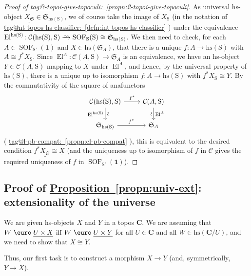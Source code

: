 \documentclass{amsart}
\makeatletter
\newcommand\alttext{\texorpdfstring}
\newcommand\bC{\mathbf{C}}
\newcommand\cC{\mathcal{C}}
\newcommand\Ein{\mathrel{\text{\textup{\euro}}}}
\newcommand\El{\operatorname{El}}
\newcommand\fS{\mathfrak{S}}
\newcommand\hs{\mathrm{hs}}
\newcommand\rS{\mathrm{S}}
\newcommand\SOF{\operatorname{SOF}}
\newcommand\tm{\mathbf{1}}
\newcommand\toi{\xrightarrow{\raisebox{-2.5pt}[0pt][0pt]{\ensuremath{\scriptstyle{\sim}}}}}
\newcommand\und[1]{\underline{#1}}
\newcommand\tagword[1]{\csname tag@#1\endcsname}
\def\label@tag#1:#2\@nil{#1}
\newcommand\labeltag[1]{\label@tag#1:\@nil}
\newcommand\jref[1]{%
  \texorpdfstring%
    {\hyperref[#1]{\tagword{\labeltag{#1}}~\ref*{#1}}}%
    {\tagword{\labeltag{#1}}~\ref*{#1}}%
}
\theoremstyle{definition}
\theoremstyle{remark}
\theoremstyle{plainwithref}
\makeatother
\begin{document}
\begin{proof}[Proof of \jref{propn:2-topoi-give-topoculi}]
  As universal hs-object \( \und{X_\fS} \in \fS_{\hs(\rS)} \), we of course take the image of \( X_\rS \) (in the notation of \jref{defn:int-topos-hs-classifier}) under the equivalence \( \El^{\hs(\rS)} \colon \cC(\hs(\rS), \rS) \toi \SOF_{\rS}(\rS) \cong \fS_{\hs(\rS)} \).
  We then need to check, for each \( A \in \SOF_{\rS'}(\tm) \) and \( X \in \hs(\fS_A) \), that there is a unique \( f \colon A \to \hs(\rS) \) with \( A \cong f^* X_\rS \).
  Since \( \El^A \colon \cC(A, \rS) \to \fS_A \) is an equivalence, we have an hs-object \( Y \in \cC(A, \rS) \) mapping to \( X \) under \( \El^A \), and hence, by the universal property of \( \hs(\rS) \), there is a unique up to isomorphism \( f \colon A \to \hs(\rS) \) with \( f^* X_\rS \cong Y \).
  By the commutativity of the square of anafunctors
  \[
    \begin{tikzcd}
      \cC(\hs(\rS), \rS) \ar[r, "f^*"] \ar[d, "\El^{\hs(\rS)}"', "\sim" sloped] & \cC(A, \rS) \ar[d, "\El^{A}", "\sim"' sloped] \\
      \fS_{\hs(\rS)} \ar[r, "f^*"] & \fS_A
    \end{tikzcd}
  \]
  (\jref{propn:el-pb-compat}), this is equivalent to the desired condition \( f^* \und{X_{\fS}} \cong \und X \) (and the uniqueness up to isomorphism of \( f \) in \( \cC \) gives the required uniqueness of \( f \) in \( \SOF_{\rS'}(\tm) \)).
\end{proof}

\subsection{Proof of \alttext{\hyperref[propn:univ-ext]{Proposition~\ref*{propn:univ-ext}}}{Proposition~\ref*{propn:univ-ext}}: extensionality of the universe} \label{subsec:univ-ext-proof}
We are given hs-objects \( X \) and \( Y \) in a topos \( \bC \).
We are assuming that \( W \Ein \und{U \times X} \) iff \( W \Ein \und{U \times Y} \) for all \( U \in \bC \) and all \( W \in \hs(\bC / U) \), and we need to show that \( X \cong Y \).

Thus, our first task is to construct a morphism \( X \to Y \) (and, symmetrically, \( Y \to X \)).
\end{document}
